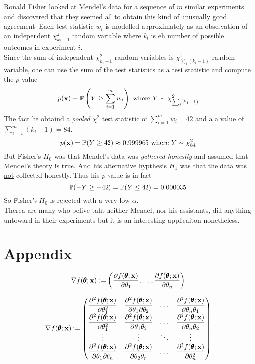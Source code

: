 \documentclass[11pt,a4paper]{article}
\begin{document}
Ronald Fisher looked at Mendel's data for a sequence of $m$ similar experiments and discovered that they seemed all to obtain this kind of unusually good agreement. Each test statistic $w_i$ is modelled approximately as an observation of an independent $\chi^2_{k_i-1}$ random variable where $k_i$ is eh number of possible outcomes in experiment $i$.\\
Since the sum of independent $\chi^2_{k_i-1}$ random variables is $\chi^2_{\sum_i(k_i-1)}$ random variable, one can use the sum of the test statistics as a test statistic and compute the $p$-value
$$p(\textbf{x})=\mathbb{P}\left(Y\geq\sum_{i=1}^mw_i\right)\text{ where }Y\sim\chi^2_{\sum_i(k_1-1)}$$
The fact he obtaind a \textit{pooled $\chi^2$} test statistic of $\sum_{i=1}^mw_i=42$ and a a value of $\sum_{i=1}^m(k_i-1)=84$.\\
$$p(\textbf{x})=\mathbb{P}(Y\geq42)\approx0.999965\text{ where }Y\sim\chi^2_{84}$$
But Fisher's $H_0$ was that Mendel's data was \textit{gathered honestly} and assumed that Mendel's theory is true. And his alternative hypthesis $H_1$ was that the data was \underline{not} collected honestly. Thus his $p$-value is in fact
$$\mathbb{P}(-Y\geq-42)=\mathbb{P}(Y\leq42)=0.000035$$
So Fisher's $H_0$ is rejected with a very low $\alpha$.\\
Therea are many who belive taht neither Mendel, nor his assistants, did anything untoward in their experiments but it is an interesting applicaiton nonetheless.

\newpage
\setcounter{section}{-1}
\section{Appendix}

$$\nabla f(\pmb{\theta};\textbf{x}):=\left(\dfrac{\partial f(\pmb{\theta};\textbf{x})}{\partial\theta_1},\dots,\dfrac{\partial f(\pmb{\theta};\textbf{x})}{\partial\theta_n}\right)$$

$$\nabla f(\pmb{\theta};\textbf{x}):=\begin{pmatrix}
\dfrac{\partial^2 f(\pmb{\theta};\textbf{x})}{\partial\theta_1^2}&\dfrac{\partial^2 f(\pmb{\theta};\textbf{x})}{\partial\theta_1\partial\theta_2}&\dots&\dfrac{\partial^2 f(\pmb{\theta};\textbf{x})}{\partial\theta_n\theta_1}\\
\dfrac{\partial^2 f(\pmb{\theta};\textbf{x})}{\partial\theta_1^2}&\dfrac{\partial^2 f(\pmb{\theta};\textbf{x})}{\partial\theta_1\theta_2}&\dots&\dfrac{\partial^2 f(\pmb{\theta};\textbf{x})}{\partial\theta_n\theta_2}\\
\vdots&\vdots&\ddots&\vdots\\
\dfrac{\partial^2 f(\pmb{\theta};\textbf{x})}{\partial\theta_1\partial\theta_n}&\dfrac{\partial^2 f(\pmb{\theta};\textbf{x})}{\partial\theta_2\theta_n}&\dots&\dfrac{\partial^2 f(\pmb{\theta};\textbf{x})}{\partial\theta_n^2}
\end{pmatrix}$$
\end{document}
